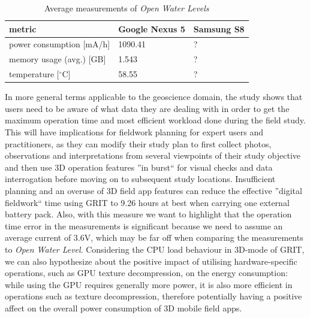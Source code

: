 \documentclass[review]{elsarticle}
\begin{document}
\begin{center}
\begin{longtable}[HT]{| l | p{2.5cm} | p{2.5cm} |}
	\caption{Average measurements of \textit{Open Water Levels}}
	\label{table:power:OWL}
	\endhead
		\hline
		metric & Google Nexus 5 & Samsung S8 \\ \hline
		power consumption [mA/h] & 1090.41 & ? \\ \hline
		memory usage (avg.) [GB] & 1.543 & ? \\ \hline
		temperature [$^{\circ}$C] & 58.55 & ? \\ \hline
\end{longtable}
\end{center}

In more general terms applicable to the geoscience domain, the study shows that users need to be aware of what data they are dealing with in order to get the maximum operation time and most efficient workload done during the field study. This will have implications for fieldwork planning for expert users and practitioners, as they can modify their study plan to first collect photos, observations and interpretations from several viewpoints of their study objective and then use 3D operation features ''in burst`` for visual checks and data interrogation before moving on to subsequent study locations. Insufficient planning and an overuse of 3D field app features can reduce the effective ''digital fieldwork`` time using \gls{GRIT} to 9.26 hours at best when carrying one external battery pack. Also, with this measure we want to highlight that the operation time error in the measurements is significant because we need to assume an average current of 3.6V, which may be far off when comparing the measurements to \textit{Open Water Level}. Considering the \gls{CPU} load behaviour in 3D-mode of \gls{GRIT}, we can also hypothesize about the positive impact of utilising hardware-specific operations, such as \gls{GPU} texture decompression, on the energy consumption: while using the \gls{GPU} requires generally more power, it is also more efficient in operations such as texture decompression, therefore potentially having a positive affect on the overall power consumption of 3D mobile field apps.
\end{document}
